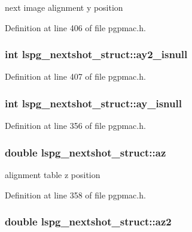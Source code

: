 next image alignment y position 



Definition at line 406 of file pgpmac.\-h.

\hypertarget{structlspg__nextshot__struct_ad0f50ec6339296d3d39c8d95131ab6b5}{
\subsubsection[{ay2\-\_\-isnull}]{\setlength{\rightskip}{0pt plus 5cm}int lspg\-\_\-nextshot\-\_\-struct\-::ay2\-\_\-isnull}}\label{structlspg__nextshot__struct_ad0f50ec6339296d3d39c8d95131ab6b5}


Definition at line 407 of file pgpmac.\-h.

\hypertarget{structlspg__nextshot__struct_a9da91abc8090532ed98ccd47a3bab775}{
\subsubsection[{ay\-\_\-isnull}]{\setlength{\rightskip}{0pt plus 5cm}int lspg\-\_\-nextshot\-\_\-struct\-::ay\-\_\-isnull}}\label{structlspg__nextshot__struct_a9da91abc8090532ed98ccd47a3bab775}


Definition at line 356 of file pgpmac.\-h.

\hypertarget{structlspg__nextshot__struct_a66e678866ce79f6398b66d033ae45a17}{
\subsubsection[{az}]{\setlength{\rightskip}{0pt plus 5cm}double lspg\-\_\-nextshot\-\_\-struct\-::az}}\label{structlspg__nextshot__struct_a66e678866ce79f6398b66d033ae45a17}


alignment table z position 



Definition at line 358 of file pgpmac.\-h.

\hypertarget{structlspg__nextshot__struct_a94698a030fd5b2abf1f10a2ad33476a4}{
\subsubsection[{az2}]{\setlength{\rightskip}{0pt plus 5cm}double lspg\-\_\-nextshot\-\_\-struct\-::az2}}\label{structlspg__nextshot__struct_a94698a030fd5b2abf1f10a2ad33476a4}


